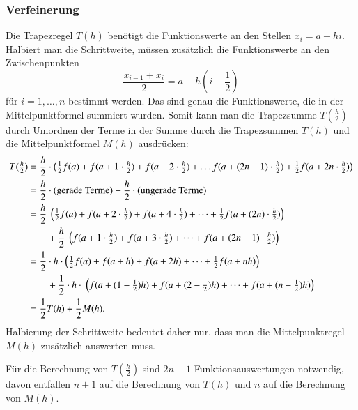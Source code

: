 \subsubsection{Verfeinerung}
Die Trapezregel $T(h)$ benötigt die Funktionswerte an den Stellen $x_i=a+hi$.
Halbiert man die Schrittweite, müssen zusätzlich die Funktionswerte
an den Zwischenpunkten
\[
\frac{x_{i-1}+x_{i}}{2}
= 
a+h(i-{\textstyle\frac12})
\]
für $i=1,\dots,n$ bestimmt werden.
Das sind genau die Funktionswerte, die in der Mittelpunktformel
summiert wurden.
Somit kann man die Trapezsumme $T(\frac{h}2)$ durch Umordnen der Terme
in der Summe durch die Trapezsummen $T(h)$ und die Mittelpunktformel
$M(h)$ ausdrücken:
\begin{align}
T({\textstyle\frac{h}2})
&=
\frac{h}2\cdot
\bigl(
{\textstyle\frac12}
f(a)
+
f(a+1\cdot {\textstyle\frac{h}2})
+
f(a+2\cdot {\textstyle\frac{h}2})
+
\dots
f(a+(2n-1)\cdot {\textstyle\frac{h}2})
+
{\textstyle\frac12}
f(a+2n\cdot {\textstyle\frac{h}2})
\bigr)
\notag
\\
&=
\frac{h}2\cdot
(\text{gerade Terme})
+
\frac{h}2\cdot
(\text{ungerade Terme})
\notag
\\
&=
\frac{h}2 \left(
{\textstyle\frac12}
f(a)
+
f(a+2\cdot {\textstyle\frac{h}2})
+
f(a+4\cdot {\textstyle\frac{h}2})
+
\dots
+
{\textstyle\frac12}
f(a+(2n)\cdot {\textstyle\frac{h}2})
\right)
\notag
\\
&\qquad
+
\frac{h}2 \left(
f(a+1\cdot {\textstyle\frac{h}2})
+
f(a+3\cdot {\textstyle\frac{h}2})
+
\dots
+
f(a+(2n-1)\cdot {\textstyle\frac{h}2})
\right)
\notag
\\
&=
\frac12\cdot h\cdot
\left(
{\textstyle\frac12}
f(a)
+
f(a+h)
+
f(a+2h)
+
\dots
+
{\textstyle\frac12}
f(a+nh)
\right)
\notag
\\
&\qquad
+
\frac12 \cdot h\cdot \left(
f(a+(1-{\textstyle\frac12})h)
+
f(a+(2-{\textstyle\frac12})h)
+
\dots
+
f(a+(n-{\textstyle\frac12})h)
\right)
\notag
\\
&=
\frac12 T(h) 
+
\frac12 M(h).
\label{buch:equation:TMrekursion}
\end{align}
Halbierung der Schrittweite bedeutet daher nur, dass man die
Mittelpunktregel $M(h)$ zusätzlich auswerten muss.

Für die Berechnung von $T(\frac{h}2)$ sind $2n+1$ Funktionsauswertungen
notwendig, davon entfallen $n+1$ auf die Berechnung von $T(h)$ und
$n$ auf die Berechnung von $M(h)$.

